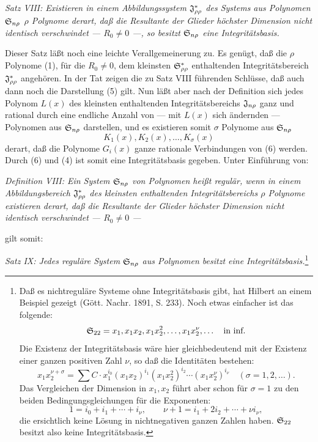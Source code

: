 \emph{Satz VIII: Existieren in einem Abbildungssystem $\mathfrak{J}^*_{\rho\rho}$ des Systems aus Polynomen $\mathfrak{S}_{n\rho}$ $\rho$ Polynome derart, daß die Resultante der Glieder höchster Dimension nicht identisch verschwindet --- $R_0\ne0$ ---, so besitzt $\mathfrak{S}_{n\rho}$ eine Integritätsbasis.}

Dieser Satz läßt noch eine leichte Verallgemeinerung zu. Es genügt, daß die $\rho$ Polynome (1), für die $R_0\ne0$, dem kleinsten $\mathfrak{S}^*_{\rho\rho}$ enthaltenden Integritätsbereich $\mathfrak{J}^*_{\rho\rho}$ angehören. In der Tat zeigen die zu Satz VIII führenden Schlüsse, daß auch dann noch die Darstellung (5) gilt. Nun läßt aber nach der Definition sich jedes Polynom $L(x)$ des kleinsten enthaltenden Integritätsbereichs $\mathfrak{J}_{n\rho}$ ganz und rational durch eine endliche Anzahl von --- mit $L(x)$ sich ändernden --- Polynomen aus $\mathfrak{S}_{n\rho}$ darstellen, und es existieren somit $\sigma$ Polynome aus $\mathfrak{S}_{n\rho}$
\begin{equation}
  K_1(x),K_2(x),\ldots,K_\sigma(x)
\tag{6}
\end{equation}
derart, daß die Polynome $G_i(x)$ ganze rationale Verbindungen von (6) werden. Durch (6) und (4) ist somit eine Integritätsbasis gegeben. Unter Einführung von:

\emph{Definition VIII: Ein System $\mathfrak{S}_{n\rho}$ von Polynomen heißt regulär, wenn in einem Abbildungsbereich $\mathfrak{J}^*_{\rho\rho}$ des kleinsten enthaltenden Integritätsbereichs $\rho$ Polynome existieren derart, daß die Resultante der Glieder höchster Dimension nicht identisch verschwindet --- $R_0\ne0$ ---}

gilt somit:

\emph{Satz IX: Jedes reguläre System $\mathfrak{S}_{n\rho}$ aus Polynomen besitzt eine Integritätsbasis.}\footnote{Daß es nichtreguläre Systeme ohne Integritätsbasis gibt, hat Hilbert an einem Beispiel gezeigt (Gött. Nachr. 1891, S. 233). Noch etwas einfacher ist das folgende:
\[
  \mathfrak{S}_{22}=x_1,
  x_1x_2,
  x_1x_2^2,
  \ldots,
  x_1x_2^\nu,
  \ldots\quad\text{in inf.}
\]
Die Existenz der Integritätsbasis wäre hier gleichbedeutend mit der Existenz einer ganzen positiven Zahl $\nu$, so daß die Identitäten bestehen:
\[
  x_1x_2^{\nu+\sigma}=\sum C\cdot x_1^{i_0}(x_1x_2)^{i_1}(x_1x_2^2)^{i_2}\cdots(x_1x_2^\nu)^{i_\nu}
  \quad(\sigma=1,2,\ldots).
\]
Das Vergleichen der Dimension in $x_1,x_2$ führt aber schon für $\sigma=1$ zu den beiden Bedingungsgleichungen für die Exponenten:
\[
  1=i_0+i_1+\cdots+i_\nu,
  \qquad
  \nu+1=i_1+2i_2+\cdots+\nu i_\nu,
\]
die ersichtlich keine Lösung in nichtnegativen ganzen Zahlen haben. $\mathfrak{S}_{22}$ besitzt also keine Integritätsbasis.}

